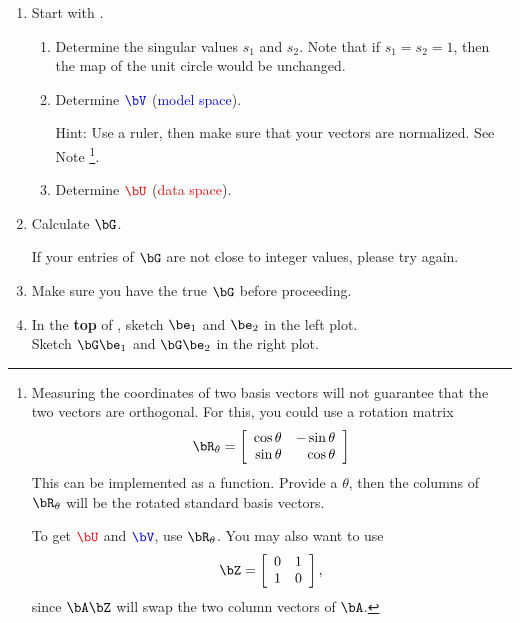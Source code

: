 \documentclass[11pt,titlepage,fleqn]{article}
\begin{document}
\begin{enumerate}

\item Start with .
%
\begin{enumerate}
\item Determine the singular values $s_1$ and $s_2$. Note that if $s_1 = s_2 = 1$, then the map of the unit circle would be unchanged.

\item Determine $\Vcolor$ (\textcolor{blue}{model space}).

Hint: Use a ruler, then make sure that your vectors are normalized. See Note \footnote{
Measuring the coordinates of two basis vectors will not guarantee that the two vectors are orthogonal. For this, you could use a rotation matrix
%
\begin{equation}
\bR_\theta = \left[
\begin{array}{rr}
\cos\theta & -\sin\theta \\ 
\sin\theta & \cos\theta
\end{array}
\right]
\end{equation}
%
This can be implemented as a function. Provide a $\theta$, then the columns of $\bR_\theta$ will be the rotated standard basis vectors.

To get $\Ucolor$ and $\Vcolor$, use $\bR_\theta$. You may also want to use
%
\begin{equation}
\bZ = \left[
\begin{array}{rr}
0 & 1 \\ 
1 & 0
\end{array}
\right],
\end{equation}
%
since $\bA\bZ$ will swap the two column vectors of $\bA$.
}.

\item Determine $\Ucolor$ (\textcolor{red}{data space}).

\end{enumerate}

\item Calculate $\bG$.

If your entries of $\bG$ are not close to integer values, please try again.

\item Make sure you have the true $\bG$ before proceeding.

\item In the {\bf top} of , sketch $\be_1$ and $\be_2$ in the left plot. \\
Sketch $\bG\be_1$ and $\bG\be_2$ in the right plot.


\end{enumerate}
\end{document}
